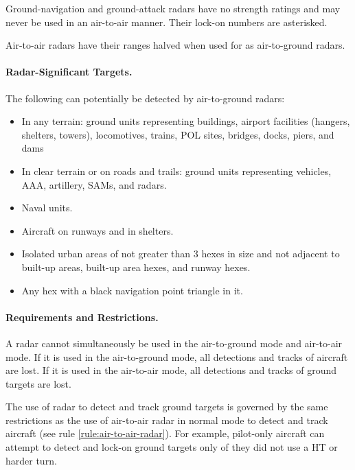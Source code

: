 \begin{advancedrules}
{Ground-navigation and ground-attack radars have no strength ratings and may never be used in an air-to-air manner. Their lock-on numbers are asterisked.

Air-to-air radars have their ranges halved when used for as air-to-ground radars.

\paragraph{Radar-Significant Targets.} The following can potentially be detected by air-to-ground radars:

\begin{itemize}

    \item In any terrain: ground units representing buildings, airport facilities (hangers, shelters, towers), locomotives, trains, POL sites, bridges, docks, piers, and dams

    \item In clear terrain or on roads and trails: ground units representing vehicles, AAA, artillery, SAMs, and radars.

    \item Naval units.

    \item Aircraft on runways and in shelters.

    \item Isolated urban areas of not greater than 3 hexes in size and not adjacent to built-up areas, built-up area hexes, and runway hexes.
    
    \item Any hex with a black navigation point triangle in it.

\end{itemize}

\paragraph{Requirements and Restrictions.} A radar cannot simultaneously be used in the air-to-ground mode and air-to-air mode. If it is used in the air-to-ground mode, all detections and tracks of aircraft are lost. If it is used in the air-to-air mode, all detections and tracks of ground targets are lost. 

The use of radar to detect and track ground targets is governed by the same restrictions as the use of air-to-air radar in normal mode to detect and track aircraft (see rule \ref{rule:air-to-air-radar}). For example, pilot-only aircraft can attempt to detect and lock-on ground targets only of they did not use a HT or harder turn.

}
\end{advancedrules}
